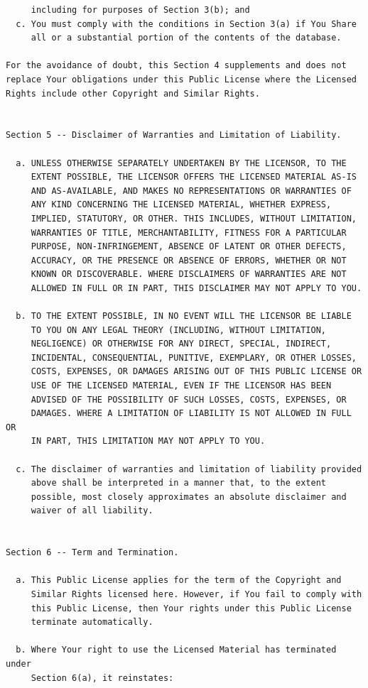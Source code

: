 \documentclass[12pt,spanish,]{scrartcl}
\begin{document}
\begin{verbatim}
     including for purposes of Section 3(b); and
  c. You must comply with the conditions in Section 3(a) if You Share
     all or a substantial portion of the contents of the database.

For the avoidance of doubt, this Section 4 supplements and does not
replace Your obligations under this Public License where the Licensed
Rights include other Copyright and Similar Rights.


Section 5 -- Disclaimer of Warranties and Limitation of Liability.

  a. UNLESS OTHERWISE SEPARATELY UNDERTAKEN BY THE LICENSOR, TO THE
     EXTENT POSSIBLE, THE LICENSOR OFFERS THE LICENSED MATERIAL AS-IS
     AND AS-AVAILABLE, AND MAKES NO REPRESENTATIONS OR WARRANTIES OF
     ANY KIND CONCERNING THE LICENSED MATERIAL, WHETHER EXPRESS,
     IMPLIED, STATUTORY, OR OTHER. THIS INCLUDES, WITHOUT LIMITATION,
     WARRANTIES OF TITLE, MERCHANTABILITY, FITNESS FOR A PARTICULAR
     PURPOSE, NON-INFRINGEMENT, ABSENCE OF LATENT OR OTHER DEFECTS,
     ACCURACY, OR THE PRESENCE OR ABSENCE OF ERRORS, WHETHER OR NOT
     KNOWN OR DISCOVERABLE. WHERE DISCLAIMERS OF WARRANTIES ARE NOT
     ALLOWED IN FULL OR IN PART, THIS DISCLAIMER MAY NOT APPLY TO YOU.

  b. TO THE EXTENT POSSIBLE, IN NO EVENT WILL THE LICENSOR BE LIABLE
     TO YOU ON ANY LEGAL THEORY (INCLUDING, WITHOUT LIMITATION,
     NEGLIGENCE) OR OTHERWISE FOR ANY DIRECT, SPECIAL, INDIRECT,
     INCIDENTAL, CONSEQUENTIAL, PUNITIVE, EXEMPLARY, OR OTHER LOSSES,
     COSTS, EXPENSES, OR DAMAGES ARISING OUT OF THIS PUBLIC LICENSE OR
     USE OF THE LICENSED MATERIAL, EVEN IF THE LICENSOR HAS BEEN
     ADVISED OF THE POSSIBILITY OF SUCH LOSSES, COSTS, EXPENSES, OR
     DAMAGES. WHERE A LIMITATION OF LIABILITY IS NOT ALLOWED IN FULL OR
     IN PART, THIS LIMITATION MAY NOT APPLY TO YOU.

  c. The disclaimer of warranties and limitation of liability provided
     above shall be interpreted in a manner that, to the extent
     possible, most closely approximates an absolute disclaimer and
     waiver of all liability.


Section 6 -- Term and Termination.

  a. This Public License applies for the term of the Copyright and
     Similar Rights licensed here. However, if You fail to comply with
     this Public License, then Your rights under this Public License
     terminate automatically.

  b. Where Your right to use the Licensed Material has terminated under
     Section 6(a), it reinstates:


\end{verbatim}
\end{document}
